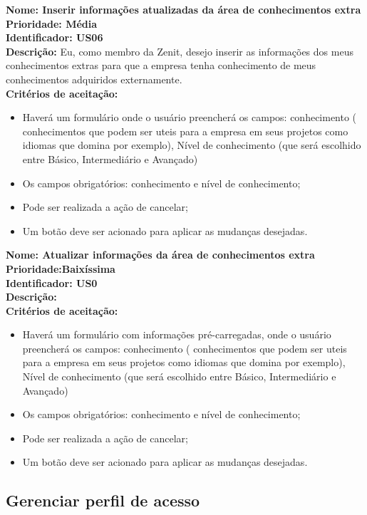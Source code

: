 \begin{anexosenv}
\textbf{Nome: Inserir informações atualizadas da área de conhecimentos extra\\
    Prioridade: Média\\
    Identificador: US06\\
    Descrição:} Eu, como membro da Zenit, desejo inserir as informações dos meus conhecimentos extras para que a empresa tenha conhecimento de meus conhecimentos adquiridos externamente.\\
\textbf{Critérios de aceitação:}
\begin{itemize}
    \item Haverá um formulário onde o usuário preencherá os campos: conhecimento                     ( conhecimentos que podem ser uteis para a empresa em seus projetos como idiomas que domina por exemplo), Nível de conhecimento (que será escolhido entre Básico, Intermediário e Avançado)
    \item Os campos obrigatórios: conhecimento e nível de conhecimento;
    \item Pode ser realizada a ação de cancelar;
    \item Um botão deve ser acionado para aplicar as mudanças desejadas.
\end{itemize}

\textbf{Nome: Atualizar informações da área de conhecimentos extra\\
    Prioridade:Baixíssima\\
    Identificador: US0\\
    Descrição:} \\
\textbf{Critérios de aceitação:}
\begin{itemize}
    \item Haverá um formulário com informações pré-carregadas, onde o usuário preencherá os campos: conhecimento ( conhecimentos que podem ser uteis para a empresa em seus projetos como idiomas que domina por exemplo), Nível de conhecimento (que será escolhido entre Básico, Intermediário e Avançado)
    \item Os campos obrigatórios: conhecimento e nível de conhecimento;
    \item Pode ser realizada a ação de cancelar;
    \item Um botão deve ser acionado para aplicar as mudanças desejadas.
\end{itemize}

\subsection{Gerenciar perfil de acesso}


\end{anexosenv}
